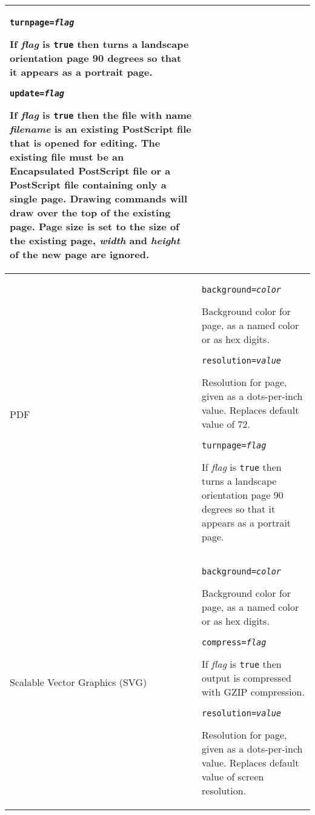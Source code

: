 \begin{longtable}{|p{4cm}|p{10cm}|}
\vspace{10pt}
\texttt{turnpage=\textit{flag}}

If \textit{flag} is \texttt{true} then
turns a landscape orientation page 90 degrees so that it appears
as a portrait page.

\vspace{10pt}
\texttt{update=\textit{flag}}

If \textit{flag} is \texttt{true} then the file with name
\textit{filename} is an existing PostScript 
file that is opened for editing.  The existing file must be an
Encapsulated PostScript file or a PostScript file containing only
a single page.
Drawing commands will draw over the top of the existing page.
Page size is set to the size of the existing page,
\textit{width} and \textit{height} of the new page are ignored.  \\

\hline

PDF &

\texttt{background=\textit{color}}

Background color for page, as a named color or as hex digits.

\vspace{10pt}
\texttt{resolution=\textit{value}}

Resolution for page, given as a dots-per-inch value.  Replaces
default value of 72.

\vspace{10pt}
\texttt{turnpage=\textit{flag}}

If \textit{flag} is \texttt{true} then
turns a landscape orientation page 90 degrees so that it appears
as a portrait page. \\

\hline

Scalable Vector Graphics (SVG) &

\texttt{background=\textit{color}}

Background color for page, as a named color or as hex digits.

\vspace{10pt}
\texttt{compress=\textit{flag}}

If \textit{flag} is \texttt{true} then output is compressed with GZIP
compression.

\vspace{10pt}
\texttt{resolution=\textit{value}}

Resolution for page, given as a dots-per-inch value.  Replaces
default value of screen resolution. \\


\end{longtable}

